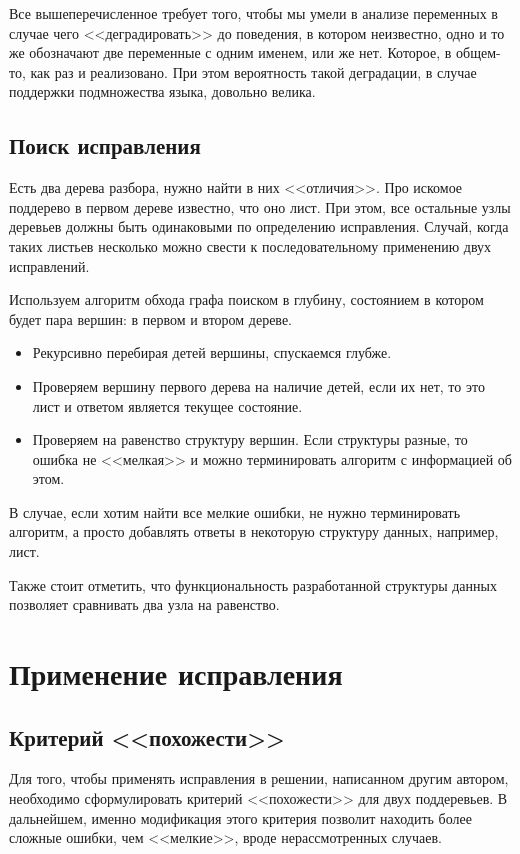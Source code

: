 Все вышеперечисленное требует того, чтобы мы умели в анализе
переменных в случае чего <<деградировать>> до поведения, в котором
неизвестно, одно и то же обозначают две переменные с одним именем, или
же нет. Которое, в общем-то, как раз и реализовано. При этом
вероятность такой деградации, в случае поддержки подмножества языка,
довольно велика.

\subsection{Поиск исправления}

Есть два дерева разбора, нужно найти в них <<отличия>>. Про искомое поддерево в первом дереве известно, что оно лист.
При этом, все остальные узлы деревьев должны быть одинаковыми по определению исправления. Случай, когда таких листьев
несколько можно свести к последовательному применению двух исправлений.

Используем алгоритм обхода графа поиском в глубину, состоянием в котором будет пара вершин: в первом и втором дереве.
\begin{itemize}
\item Рекурсивно перебирая детей вершины, спускаемся глубже.
\item Проверяем вершину первого дерева на наличие детей, если их нет, то это лист и ответом является текущее состояние.
\item Проверяем на равенство структуру вершин. Если структуры разные, то ошибка не <<мелкая>> и можно терминировать алгоритм
    с информацией об этом.
\end{itemize}

В случае, если хотим найти все мелкие ошибки, не нужно терминировать алгоритм, а просто добавлять ответы в некоторую структуру данных,
например, лист.

Также стоит отметить, что функциональность разработанной структуры данных позволяет сравнивать два узла на равенство.

\section{Применение исправления}

\subsection{Критерий <<похожести>>}
Для того, чтобы применять исправления в решении, написанном другим автором, необходимо сформулировать критерий <<похожести>>
для двух поддеревьев. В дальнейшем, именно модификация этого критерия позволит находить более сложные ошибки, чем <<мелкие>>,
вроде нерассмотренных случаев.

